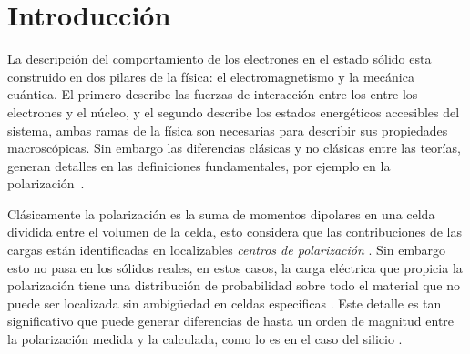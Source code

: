 \chapter{Introducci\'on} %



La descripción del comportamiento de los electrones en el estado sólido esta construido en dos pilares de la física: el electromagnetismo y la mecánica cuántica. El primero describe las fuerzas de interacción entre los entre los electrones y el núcleo, y el segundo describe los estados energéticos accesibles del sistema, ambas ramas de la física son necesarias para describir sus propiedades macroscópicas. Sin embargo las diferencias clásicas y no clásicas entre las teorías, generan detalles en las definiciones fundamentales, por ejemplo en la polarización~\cite{Shore2018}.


Clásicamente la polarización es la suma de momentos dipolares en una celda dividida entre el volumen de la celda, esto considera que las contribuciones de las cargas están identificadas en localizables {\it centros de polarización} . Sin embargo esto no pasa en los sólidos reales, en estos casos, la carga eléctrica que propicia la polarización tiene una distribución de probabilidad sobre todo el material que no puede ser localizada sin ambigüedad en celdas especificas . Este detalle es tan significativo que puede generar diferencias de hasta un orden de magnitud entre la polarización medida y la calculada, como lo es en el caso del silicio \cite{rabe2007modern}.

